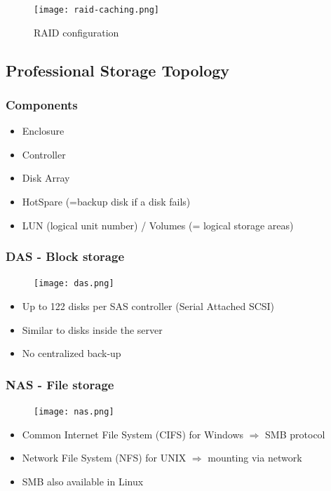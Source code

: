 \documentclass{article}
\begin{document}
\begin{figure}[H]
    \centering
    \texttt{[image: raid-caching.png]}
    \caption{RAID configuration}
\end{figure}


\subsection{Professional Storage Topology}

\subsubsection{Components}

\begin{itemize}
    \item Enclosure
    \item Controller
    \item Disk Array
    \item HotSpare (=backup disk if a disk fails)
    \item LUN (logical unit number) / Volumes (= logical storage areas)
\end{itemize}

\subsubsection{DAS - Block storage}

\begin{figure}[H]
    \centering
    \texttt{[image: das.png]}
\end{figure}

\begin{itemize}
    \item Up to 122 disks per SAS controller (Serial Attached SCSI)
    \item Similar to disks inside the server
    \item No centralized back-up
\end{itemize}


\subsubsection{NAS - File storage}

\begin{figure}[H]
    \centering
    \texttt{[image: nas.png]}
\end{figure}

\begin{itemize}
    \item Common Internet File System (CIFS) for Windows $\Rightarrow$ SMB protocol
    \item Network File System (NFS) for UNIX $\Rightarrow$ mounting via network
    \item SMB also available in Linux
\end{itemize}
\end{document}

